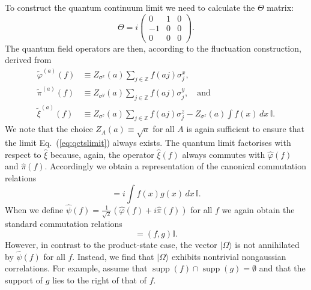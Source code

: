 \documentclass[prl,twocolumn,lengthcheck,superscriptaddress]{revtex4-1}
\newcommand{\supp}{\operatorname{supp}}
\theoremstyle{definition}
\theoremstyle{remark}
\begin{document}
To construct the quantum continuum limit we need to calculate the $\Theta$ matrix:
\begin{equation}
	\Theta = i\begin{pmatrix} 0 & 1 & 0 \\ -1 & 0 & 0  \\ 0 & 0 & 0  \end{pmatrix}.
\end{equation}
The quantum field operators are then, according to the fluctuation construction, derived from
\begin{equation}
	\begin{split}
		\widetilde{\varphi}^{(a)}(f) &\equiv Z_{\sigma^x}(a) \sum_{j\in \mathbb{Z}} f(aj) \sigma^x_j,\\
		\widetilde{\pi}^{(a)}(f) &\equiv Z_{\sigma^y}(a) \sum_{j\in \mathbb{Z}} f(aj) \sigma^y_j, \quad \text{and}\\
		\widetilde{\xi}^{(a)}(f) &\equiv Z_{\sigma^z}(a) \sum_{j\in \mathbb{Z}} f(aj) \sigma^z_j - Z_{\sigma^z}(a) \int f(x) \,dx\, \mathbb{I}.
	\end{split}
\end{equation}
We note that the choice $Z_A(a) \equiv \sqrt{a}$ for all $A$ is again sufficient to ensure that the limit Eq.~(\ref{eq:qctslimit}) always exists. The quantum limit factorises with respect to $\widehat{\xi}$ because, again, the operator $\widehat{\xi}(f)$ always commutes with $\widehat{\varphi}(f)$ and $\widehat{\pi}(f)$. Accordingly we obtain a representation of the canonical commutation relations  
\begin{equation}
	[\widehat{\varphi}(f), \widehat{\pi}(g)] = i \int f(x)g(x)\,dx\, \mathbb{I}.
\end{equation}
When we define $\widehat{\psi}(f) = \frac{1}{\sqrt2}(\widehat{\varphi}(f) + i \widehat{\pi}(f))$ for all $f$ we again obtain the standard commutation relations
\begin{equation}
	[\widehat{\psi}(f), \widehat{\psi}^\dag(g)] = (f,g)\mathbb{I}.
\end{equation}
However, in contrast to the product-state case,  the vector $|\Omega\rangle$ is not annihilated by $\widehat{\psi}(f)$ for all $f$. Instead, we find that $|\Omega\rangle$ exhibits nontrivial nongaussian correlations. For example, assume that $\supp(f)\cap \supp(g) = \emptyset$ and that the support of $g$ lies to the right of that of $f$.
\end{document}
